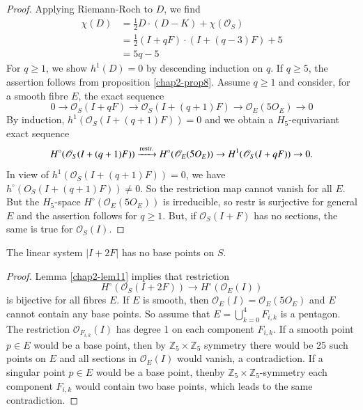 \begin{proof}
Applying Riemann-Roch to $D$, we find
\begin{align*}
\chi(D) & = \frac{1}{2}D\cdot (D-K)+\chi(\mathscr{O}_{S})\\[5pt]
&= \frac{1}{2}(I+qF)\cdot (I+(q-3)F)+5\\[5pt]
&= 5q-5
\end{align*}
For $q\geq 1$, we show $h^{1}(D)=0$ by descending induction on $q$. If
$q\geq 5$, the assertion follows from
proposition \ref{chap2-prop8}. Assume $q\geq 1$ and consider, for a
smooth fibre $E$, the exact sequence 
$$
0\to \mathscr{O}_{S}(I+qF)\to \mathscr{O}_{S}(I+(q+1)F)\to \mathscr{O}_{E}(5O_{E})\to 0
$$\pageoriginale
By induction, $h^{1}(\mathscr{O}_{S}(I+(q+1)F))=0$ and we obtain a
$H_{5}$-equivariant exact sequence
$$
H^{\circ}(\mathscr{O}_{S}(I+(q+1)F))\xrightarrow{\rm restr.}
H^{\circ}(\mathscr{O}_{E}(5O_{E}))\to H^{1}(\mathscr{O}_{S}(I+qF))\to 0.
$$
In view of $h^{1}(\mathscr{O}_{S}(I+(q+1)F))=0$, we have
$h^{\circ}(O_{S}(I+(q+1)F))\neq 0$. So the restriction map cannot
vanish for all $E$. But the $H_{5}$-space
$H^{\circ}(\mathscr{O}_{E}(5O_{E}))$ is irreducible, so restr is
surjective for general $E$ and the assertion follows for $q\geq
1$. But, if $\mathscr{O}_{S}(I+F)$ has no sections, the same is true
for $\mathscr{O}_{S}(I)$.
\end{proof}

\begin{lemma}\label{chap2-lem12}
The linear system $|I+2F|$ has no base points on $S$.
\end{lemma}

\begin{proof}
Lemma \ref{chap2-lem11} implies that restriction
$$
H^{\circ}(\mathscr{O}_{S}(I+2F))\to H^{\circ}(\mathscr{O}_{E}(I))
$$
is bijective for all fibres $E$. If $E$ is smooth, then
$\mathscr{O}_{E}(I)=\mathscr{O}_{E}(5O_{E})$ and $E$ cannot contain
any base points. So assume that $E=\bigcup\limits^{4}_{k=0}F_{i,k}$ is
a pentagon. The restriction $\mathscr{O}_{F_{i,k}}(I)$ has degree 1 on
each component $F_{i,k}$. If a smooth point $p\in E$ would be a base
point, then by $\mathbb{Z}_{5}\times \mathbb{Z}_{5}$ symmetry there
would be 25 such points on $E$ and all sections in
$\mathscr{O}_{E}(I)$ would vanish, a contradiction. If a singular
point $p\in E$ would be a base point, then\pageoriginale by
$\mathbb{Z}_{5}\times \mathbb{Z}_{5}$-symmetry each component
$F_{i,k}$ would contain two base points, which leads to the same
contradiction. 
\end{proof}

